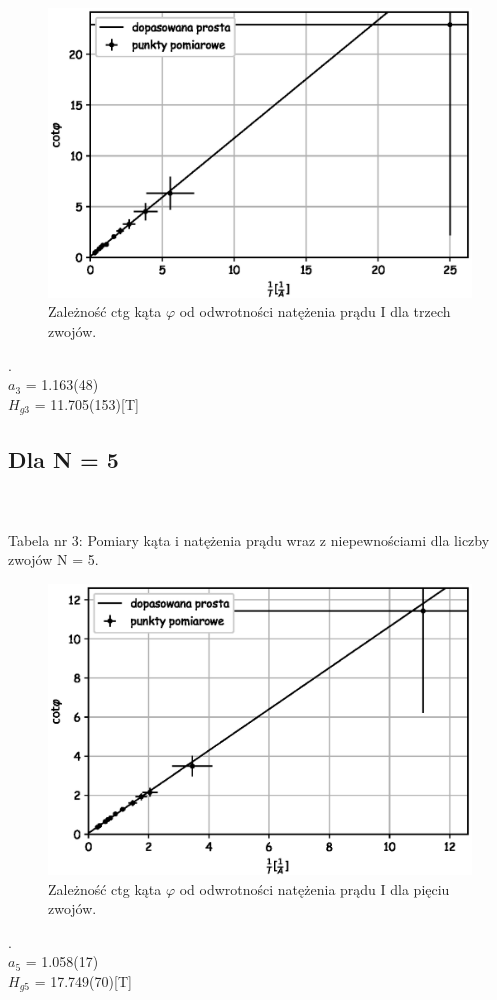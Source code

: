 \documentclass[a4paper,10pt]{article}
\begin{document}
\begin{figure}[H]
  \includegraphics{./wykres_3.eps}
  \renewcommand*{\figurename}{Wykres nr} 
  \caption{Zależność ctg kąta $\varphi$ od odwrotności natężenia prądu I dla trzech zwojów.}
  \label{}
\end{figure}.
\\$a_3$ = 1.163(48)\\
$H_{g3}$ = 11.705(153)[T]\\

\subsection{Dla N = 5}

\\
\\Tabela nr 3: Pomiary kąta i natężenia prądu wraz z niepewnościami dla liczby zwojów N = 5.

\begin{figure}[H]
  \includegraphics{./wykres_5.eps}
   \renewcommand*{\figurename}{Wykres nr} 
   \caption{Zależność ctg kąta $\varphi$ od odwrotności natężenia prądu I dla pięciu zwojów.}
  \label{}
\end{figure}.
\\$a_5$ = 1.058(17)\\
$H_{g5}$ = 17.749(70)[T]\\
\end{document}
